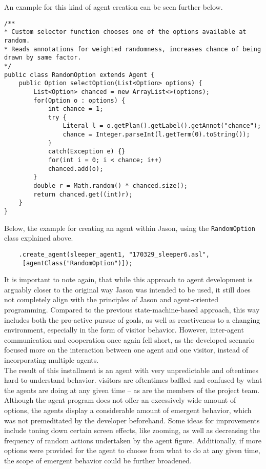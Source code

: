 \documentclass[draft,final]{vutinfth} %
\begin{document}
An example for this kind of agent creation can be seen further below.
\begin{lstlisting}
/**
* Custom selector function chooses one of the options available at random.
* Reads annotations for weighted randomness, increases chance of being drawn by same factor.
*/
public class RandomOption extends Agent {
	public Option selectOption(List<Option> options) {
		List<Option> chanced = new ArrayList<>(options);
		for(Option o : options) {
			int chance = 1;
			try {
				Literal l = o.getPlan().getLabel().getAnnot("chance");
				chance = Integer.parseInt(l.getTerm(0).toString());
			}
			catch(Exception e) {}
			for(int i = 0; i < chance; i++)
			chanced.add(o);
		}
		double r = Math.random() * chanced.size();
		return chanced.get((int)r);
	}
}
\end{lstlisting}
Below, the example for creating an agent within Jason, using the \verb|RandomOption| class explained above.
\begin{verbatim}
    .create_agent(sleeper_agent1, "170329_sleeper6.asl",
     [agentClass("RandomOption")]);
\end{verbatim}
It is important to note again, that while this approach to agent development is arguably closer to the original way Jason was intended to be used, it still does not completely align with the principles of Jason and agent-oriented programming. 
Compared to the previous state-machine-based approach, this way includes both the pro-active pursue of goals, as well as reactiveness to a changing environment, especially in the form of \gls{visitor} behavior.
However, inter-agent communication and cooperation once again fell short, as the developed scenario focused more on the interaction between one agent and one \gls{visitor}, instead of incorporating multiple agents. \\
The result of this installment is an agent with very unpredictable and oftentimes hard-to-understand behavior. 
\Glspl{visitor} are oftentimes baffled and confused by what the agents are doing at any given time – as are the members of the project team. 
Although the agent program does not offer an excessively wide amount of options, the agents display a considerable amount of emergent behavior, which was not premeditated by the developer beforehand. 
Some ideas for improvements include toning down certain screen effects, like zooming, as well as decreasing the frequency of random actions undertaken by the \gls{agent figure}. 
Additionally, if more options were provided for the agent to choose from what to do at any given time, the scope of emergent behavior could be further broadened. \\
\end{document}

